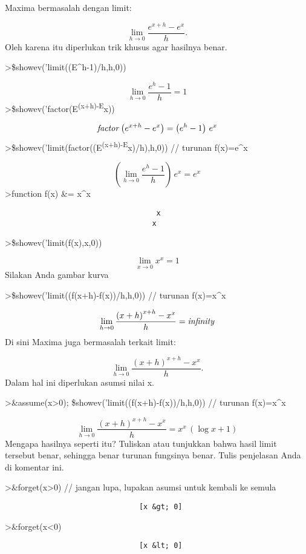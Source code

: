 \documentclass[
]{book}
\begin{document}
Maxima bermasalah dengan limit:

\[\lim_{h\to 0}\frac{e^{x+h}-e^x}{h}.\]Oleh karena itu diperlukan trik khusus agar hasilnya benar.

\textgreater\$showev('limit((E\^{}h-1)/h,h,0))

\[\lim_{h\rightarrow 0}{\frac{e^{h}-1}{h}}=1\]\textgreater\$showev('factor(E\textsuperscript{(x+h)-E}x))

\[{\it factor}\left(e^{x+h}-e^{x}\right)=\left(e^{h}-1\right)\,e^{x}\]\textgreater\$showev('limit(factor((E\textsuperscript{(x+h)-E}x)/h),h,0)) // turunan f(x)=e\^{}x

\[\left(\lim_{h\rightarrow 0}{\frac{e^{h}-1}{h}}\right)\,e^{x}=e^{x}\]\textgreater function f(x) \&= x\^{}x

\begin{verbatim}
                                   x
                                  x
\end{verbatim}

\textgreater\$showev('limit(f(x),x,0))

\[\lim_{x\rightarrow 0}{x^{x}}=1\]Silakan Anda gambar kurva

\textgreater\$showev('limit((f(x+h)-f(x))/h,h,0)) // turunan f(x)=x\^{}x

\[\lim_{h\rightarrow 0}{\frac{\left(x+h\right)^{x+h}-x^{x}}{h}}=  {\it infinity}\]Di sini Maxima juga bermasalah terkait limit:

\[\lim_{h\to 0} \frac{(x+h)^{x+h}-x^x}{h}.\]Dalam hal ini diperlukan asumsi nilai x.

\textgreater\&assume(x\textgreater0); \$showev('limit((f(x+h)-f(x))/h,h,0)) // turunan f(x)=x\^{}x

\[\lim_{h\rightarrow 0}{\frac{\left(x+h\right)^{x+h}-x^{x}}{h}}=x^{x}  \,\left(\log x+1\right)\]Mengapa hasilnya seperti itu? Tuliskan atau tunjukkan bahwa hasil limit tersebut benar, sehingga benar turunan fungsinya benar. Tulis penjelasan Anda di komentar ini.

\textgreater\&forget(x\textgreater0) // jangan lupa, lupakan asumsi untuk kembali ke semula

\begin{verbatim}
                               [x &gt; 0]
\end{verbatim}

\textgreater\&forget(x\textless0)

\begin{verbatim}
                               [x &lt; 0]
\end{verbatim}
\end{document}

